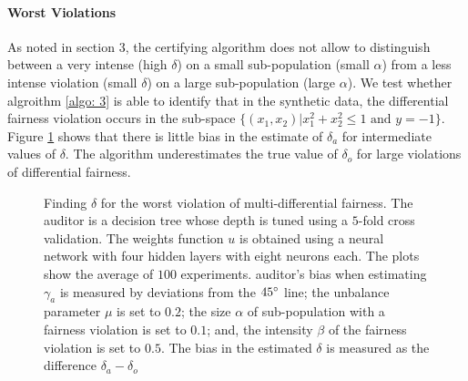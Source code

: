 \documentclass{article}
\begin{document}
\paragraph{Worst Violations}
As noted in section 3, the certifying algorithm does not allow to distinguish between a very intense (high $\delta$)
on a small sub-population (small $\alpha$) from a less intense violation (small $\delta$) on a large sub-population (large $\alpha$). We test whether algroithm \ref{algo: 3} is able to identify that in the synthetic data, the differential fairness violation occurs in the sub-space $\{(x_{1}, x_{2})|x^{2}_{1} + x^{2}_{2} \leq 1 \mbox{ and } y=-1\}$. Figure \ref{fig: 3a} shows that there is little bias in the estimate of $\delta_{a}$ for intermediate values of $\delta$. The algorithm underestimates the true value of $\delta_{o}$ for large violations of differential fairness. 
\begin{figure}[h!]
	\begin{subfigure} {.475\linewidth}
		\centering
	\end{subfigure}
	\label{fig: 3a}
	\caption{Finding $\delta$ for the worst violation of multi-differential fairness. The auditor is a decision tree whose depth is tuned using a $5$-fold cross validation.  The weights function $u$ is obtained using a neural network with four hidden layers with eight neurons each. The plots show the average of $100$ experiments. auditor's bias when estimating $\gamma_{a}$ is measured by deviations from the $45\degree$ line; the unbalance parameter $\mu$ is set to $0.2$; the size $\alpha$ of sub-population with a fairness violation is set to $0.1$; and, the intensity $\beta$ of the fairness violation is set to $0.5$.  The bias in the estimated $\delta$ is measured as the difference $\delta_{a}-\delta_{o}$  }  
\end{figure}
\end{document}
